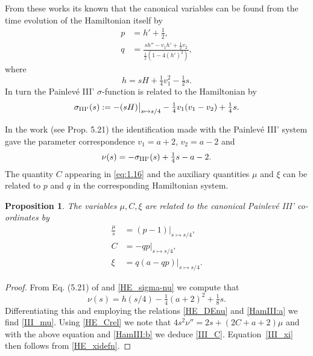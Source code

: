 \documentclass[10pt,reqno]{amsart}
\theoremstyle{plain}
\newtheorem{proposition}{Proposition}
\theoremstyle{definition}
\theoremstyle{remark}
\begin{document}
From these works its known that the canonical variables can be found from the time evolution of the
Hamiltonian itself by
\begin{align}
  p & = h' + \tfrac{1}{2} ,
\label{HamIII:a}\\
  q & = \frac{sh'' - v_1 h' + \frac{1}{2} v_2 }{\frac{1}{2}(1 - 4 (h')^2)} ,
\label{HamIII:b}
\end{align}
where
\begin{equation}\label{H4}
  h = sH + \tfrac{1}{4} v_1^2 - \tfrac{1}{2} s.
\end{equation}
In turn the Painlev\'e III' $\sigma$-function is related to the Hamiltonian by
\begin{equation}
   \sigma_{\rm III'}(s) := - (sH) \big|_{s \mapsto s/4} - \tfrac{1}{4}v_1(v_1 - v_2) + \tfrac{1}{4}s .
\end{equation} 
 
 In the work \cite{FW_2007} (see Prop. 5.21) the identification made with the Painlev\'e III' system gave the parameter
correspondence $ v_1 = a+2$, $v_2 = a-2 $ and  
\begin{equation}
   \nu(s) = -\sigma_{\rm III'}(s)+\tfrac{1}{4}s-a-2 .
\label{HE_sigma-nu}
\end{equation} 
The quantity $C$ appearing in \eqref{eq:1.16} and the auxiliary quantities  $\mu$ and $\xi $ can be related to $p$ and $q$ in the corresponding
 Hamiltonian system. 
 
\begin{proposition}  
The variables $ \mu, C, \xi $ are related to the canonical Painlev\'e III' co-ordinates by
\begin{align}
  \frac{\mu}{s} & = (p-1)\big|_{s \mapsto s/4} ,
\label{III_mu}\\
   C & = -qp\big|_{s \mapsto s/4} ,
\label{III_C}\\
  \xi & = q(a-qp)\big|_{s \mapsto s/4} .
\label{III_xi}
\end{align}
\end{proposition}
\begin{proof}
From Eq. (5.21) of \cite{FW_2007} and \eqref{HE_sigma-nu} we compute that
\begin{equation}
  \nu(s) = h(s/4) - \tfrac{1}{4}(a+2)^2 + \tfrac{1}{8}s .
\end{equation} 
Differentiating this and employing the relations \eqref{HE_DEnu} and \eqref{HamIII:a} we find \eqref{III_mu}.
Using \eqref{HE_Crel} we note that $ 4s^2{\nu''} = 2s+(2C+a+2)\mu $ and with the above equation and
\eqref{HamIII:b} we deduce \eqref{III_C}. Equation~\eqref{III_xi} then follows from \eqref{HE_xidefn}.
\end{proof}
\end{document}
